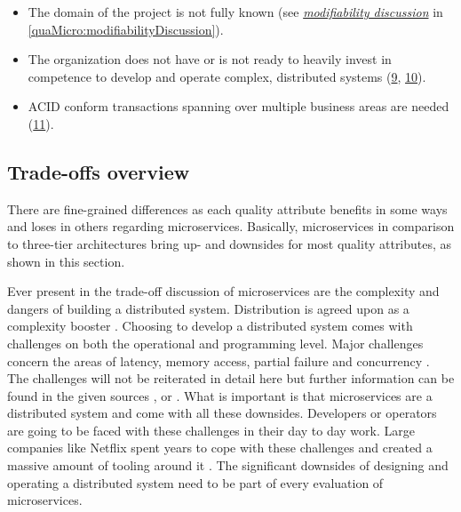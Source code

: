 \begin{itemize}
\item The domain of the project is not fully known (see \textit{\hyperref[quaMicro:modifiabilityDiscussion]{modifiability discussion}} in \ref{quaMicro:modifiabilityDiscussion}).
\item The organization does not have or is not ready to heavily invest in competence to develop and operate complex, distributed systems (\hyperref[quaMicro:s9]{9}, \hyperref[quaMicro:s10]{10}).
\item ACID conform transactions spanning over multiple business areas are needed (\hyperref[quaMicro:s11]{11}).
\end{itemize}

\subsection*{Trade-offs overview}

There are fine-grained differences as each quality attribute benefits in some ways and loses in others regarding microservices. 
Basically, microservices in comparison to three-tier architectures bring up- and downsides for most quality attributes, as shown in this section.

\label{quaMicro:distributedSystemDownsides}
Ever present in the trade-off discussion of microservices are the complexity and dangers of building a distributed system.
Distribution is agreed upon as a complexity booster \citep{FowlerDistributedObjects2014}.
Choosing to develop a distributed system comes with challenges on both the operational and programming level.
Major challenges concern the areas of latency, memory access, partial failure and concurrency \citep[p. 5]{Kendall1994}.
The challenges will not be reiterated in detail here but further information can be found in the given sources \cite{Kendall1994}, \cite{FowlerTradeoffsDistribution2015} or \cite{Deutsch2006}.
What is important is that microservices are a distributed system and come with all these downsides.
Developers or operators are going to be faced with these challenges in their day to day work. 
Large companies like Netflix spent years to cope with these challenges and created a massive amount of tooling around it \cite{Netflix2016}.
The significant downsides of designing and operating a distributed system need to be part of every evaluation of microservices.

